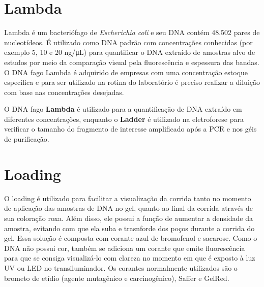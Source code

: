 \documentclass[
  letterpaper,
  DIV=11,
  numbers=noendperiod]{scrreprt}
\begin{document}
\hypertarget{lambda-1}{%
\section{Lambda}\label{lambda-1}}

Lambda é um bacteriófago de \emph{Escherichia coli} e seu DNA contém
48.502 pares de nucleotídeos. É utilizado como DNA padrão com
concentrações conhecidas (por exemplo 5, 10 e 20 ng/μL) para quantificar
o DNA extraído de amostras alvo de estudos por meio da comparação visual
pela fluorescência e espessura das bandas. O DNA fago Lambda é adquirido
de empresas com uma concentração estoque específica e para ser utilizado
na rotina do laboratório é preciso realizar a diluição com base nas
concentrações desejadas.

\begin{tcolorbox}[enhanced jigsaw, colbacktitle=quarto-callout-caution-color!10!white, toprule=.15mm, rightrule=.15mm, opacityback=0, left=2mm, arc=.35mm, breakable, colback=white, bottomtitle=1mm, opacitybacktitle=0.6, toptitle=1mm, leftrule=.75mm, coltitle=black, titlerule=0mm, bottomrule=.15mm, title=\textcolor{quarto-callout-caution-color}{\faFire}\hspace{0.5em}{Cuidado}]

O DNA fago \textbf{Lambda} é utilizado para a quantificação de DNA
extraído em diferentes concentrações, enquanto o \textbf{Ladder} é
utilizado na eletroforese para verificar o tamanho do fragmento de
interesse amplificado após a PCR e nos géis de purificação.

\end{tcolorbox}

\hypertarget{loading}{%
\section{Loading}\label{loading}}

O loading é utilizado para facilitar a visualização da corrida tanto no
momento de aplicação das amostras de DNA no gel, quanto ao final da
corrida através de sua coloração roxa. Além disso, ele possui a função
de aumentar a densidade da amostra, evitando com que ela suba e
trasnforde dos poços durante a corrida do gel. Essa solução é composta
com corante azul de bromofenol e sacarose. Como o DNA não possui cor,
também se adiciona um corante que emite fluorescência para que se
consiga visualizá-lo com clareza no momento em que é exposto à luz UV ou
LED no transiluminador. Os corantes normalmente utilizados são o brometo
de etídio (agente mutagênico e carcinogênico), Saffer e GelRed.
\end{document}
